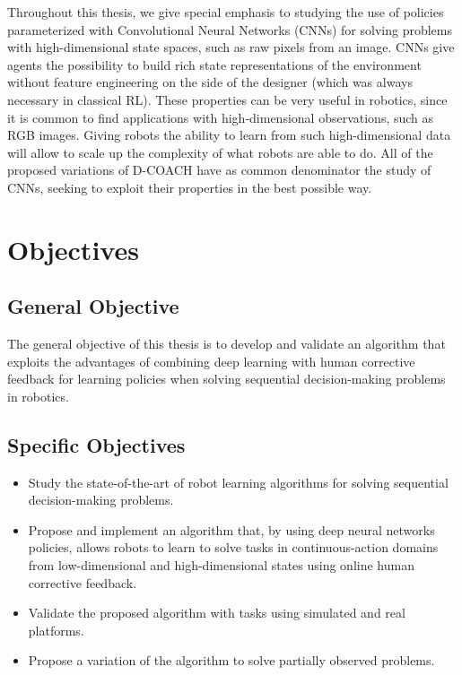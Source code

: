\begin{intro}
Throughout this thesis, we give special emphasis to studying the use of policies parameterized with Convolutional Neural Networks (CNNs) for solving problems with high-dimensional state spaces, such as raw pixels from an image. CNNs give agents the possibility to build rich state representations of the environment without feature engineering on the side of the designer (which was always necessary in classical RL). These properties can be very useful in robotics, since it is common to find applications with high-dimensional observations, such as RGB images. Giving robots the ability to learn from such high-dimensional data will allow to scale up the complexity of what robots are able to do. All of the proposed variations of D-COACH have as common denominator the study of CNNs,  seeking to exploit their properties in the best possible way. 

\section{Objectives}
\subsection{General Objective}
The general objective of this thesis is to develop and validate an algorithm that exploits the advantages of combining deep learning with human corrective feedback for learning policies when solving sequential decision-making problems in robotics. 

\subsection{Specific Objectives}

\begin{itemize}
    \item Study the state-of-the-art of robot learning algorithms for solving sequential decision-making problems.
    \item Propose and implement an algorithm that, by using deep neural networks policies, allows robots to learn to solve tasks in continuous-action domains from low-dimensional and high-dimensional states using online human corrective feedback. 
    \item Validate the proposed algorithm with tasks using simulated and real platforms.
    \item Propose a variation of the algorithm to solve partially observed problems.
\end{itemize}


\end{intro}
